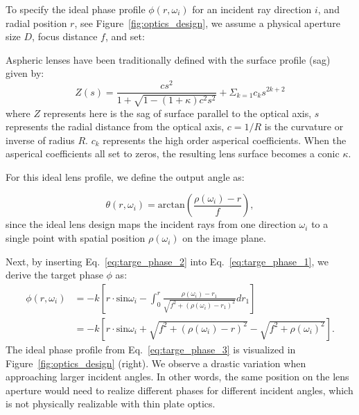  To specify the ideal phase profile $\phi(r,\omega_i)$ for an incident ray direction $i$, and radial position $r$, see Figure~\ref{fig:optics_design}, we assume a physical aperture size $D$, focus distance $f$, and set: 

Aspheric lenses have been traditionally defined with the surface profile (sag) given by: 
\begin{equation}
\label{eq:sag}
Z(s) = \frac{cs^2}{1+\sqrt{1-(1+ \kappa )c^2s^2}} + \Sigma_{k=1} c_ks^{2k+2}
\end{equation}
%
 where $Z$ represents here is the sag of surface parallel to the optical axis,  $s$
 represents the radial distance from the optical axis, $c=1/R$ is the curvature or inverse of radius
 $R$. 
 $c_k$ represents the high order asperical coefficients. When the asperical 
 coefficients all set to zeros, the resulting lens surface becomes a conic $\kappa$.
 
 
 For  this  ideal lens profile, we define the output angle as:
%
 
\begin{equation}
\label{eq:targe_phase_2}
	\theta(r,\omega_i) = \mathrm{arctan} \left( \frac{\rho(\omega_i) - r}{f} \right),
\end{equation}
%
since the ideal lens design maps the incident rays from one direction $\omega_i$ to a single point with spatial position $\rho(\omega_i)$ on the image plane.

Next,  by inserting Eq.~\ref{eq:targe_phase_2} into Eq.~\ref{eq:targe_phase_1},  we derive the target phase $\phi$ as:
%
\begin{align}
\label{eq:targe_phase_3}
\phi(r,\omega_i) &= -k \left[ r \cdot \mathrm{sin}\omega_i - \int_{0}^{r} \frac{\rho(\omega_i)-r_1}{\sqrt{f^2 + (\rho(\omega_i)-r_1)^2}} dr_1 \right] \\
&= -k\left[ r \cdot \mathrm{sin}\omega_i + \sqrt{f^2 +(\rho(\omega_i)-r)^2} - \sqrt{f^2 + \rho(\omega_i)^2} \right]. \nonumber
\end{align}
%
 The ideal phase profile from Eq.~\ref{eq:targe_phase_3} is visualized
in Figure~\ref{fig:optics_design} (right). We observe a drastic
variation when approaching larger incident angles. In other words, the
same position on the lens aperture would need to realize different phases for
different incident angles, which is not physically realizable with
thin plate optics. 
%

